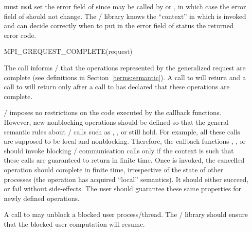 \begin{users}
 must {\bf not} set the error field of
since  may be called by  or
, in which case the error field of 
should not change.  The \MPI/ library knows the ``context'' in which
 is invoked and can decide correctly when to put
in the error field of status the returned error code.
\end{users}

\begin{funcdef}{MPI\_GREQUEST\_COMPLETE(request)}
\end{funcdef}

%



The call informs \MPI/ that the operations represented by the generalized request
 are 
complete (see 
definitions in Section~\ref{terms:semantic}).
A call to  will return and a call to
 will return 
only after a call to  has declared that
these operations are complete.

\MPI/ imposes no restrictions on the code executed by the callback functions.
However, new nonblocking operations should be defined so that the general
semantic rules about \MPI/ calls such as ,
, or  still hold.  For example, all
these calls are supposed to be local and nonblocking.  Therefore, the
callback functions , , or
 should invoke blocking \MPI/ communication
calls only if the context is such that these calls are guaranteed to
return in finite time.  
Once  is invoked, the cancelled operation
should complete in finite time, irrespective of the state of
other processes (the operation has acquired ``local'' semantics).  It
should either succeed, or fail without side-effects.  The user should
guarantee these same properties for newly defined operations.  

\begin{implementors}
A call to  may unblock a blocked user
process/thread. The \MPI/ library should ensure that the blocked user
computation will resume.
\end{implementors}

